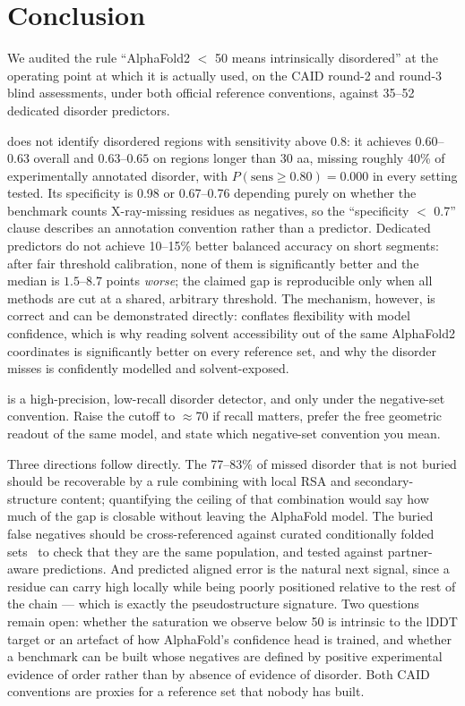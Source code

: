 \section{Conclusion}
\label{sec:conclusion}

We audited the rule ``AlphaFold2 \plddt $<$ 50 means intrinsically disordered'' at the operating
point at which it is actually used, on the CAID round-2 and round-3 blind assessments, under
both official reference conventions, against 35--52 dedicated disorder predictors.

 \plddtrule does not identify disordered regions with sensitivity above 0.8: it
achieves $0.60$--$0.63$ overall and $0.63$--$0.65$ on regions longer than 30 aa, missing roughly
40\% of experimentally annotated disorder, with $P(\text{sens} \ge 0.80) = 0.000$ in every
setting tested. Its specificity is 0.98 or 0.67--0.76 depending purely on whether the benchmark
counts X-ray-missing residues as negatives, so the ``specificity $<$ 0.7'' clause describes an
annotation convention rather than a predictor. Dedicated predictors do not achieve 10--15\%
better balanced accuracy on short segments: after fair threshold calibration, none of them is
significantly better and the median is $1.5$--$8.7$ points \emph{worse}; the claimed gap is
reproducible only when all methods are cut at a shared, arbitrary threshold. The mechanism,
however, is correct and can be demonstrated directly: \plddt conflates flexibility with model
confidence, which is why reading solvent accessibility out of the same AlphaFold2 coordinates is
significantly better on every reference set, and why the disorder \plddt misses is confidently
modelled and solvent-exposed.

 \plddtrule is a high-precision, low-recall disorder detector, and only under
the \dpdb negative-set convention. Raise the cutoff to $\approx$70 if recall matters, prefer the
free geometric readout of the same model, and state which negative-set convention you mean.

 Three directions follow directly. The 77--83\% of missed disorder that is
not buried should be recoverable by a rule combining \plddt with local RSA and secondary-structure
content; quantifying the ceiling of that combination would say how much of the gap is closable
without leaving the AlphaFold model. The buried false negatives should be cross-referenced
against curated conditionally folded \idr sets~\citep{alderson2023} to check that they are the
same population, and tested against partner-aware predictions. And predicted aligned error is
the natural next signal, since a residue can carry high \plddt locally while being poorly
positioned relative to the rest of the chain --- which is exactly the pseudostructure signature.
Two questions remain open: whether the \plddt saturation we observe below 50 is intrinsic to the
lDDT target or an artefact of how AlphaFold's confidence head is trained, and whether a benchmark
can be built whose negatives are defined by positive experimental evidence of order rather than
by absence of evidence of disorder. Both CAID conventions are proxies for a reference set that
nobody has built.
